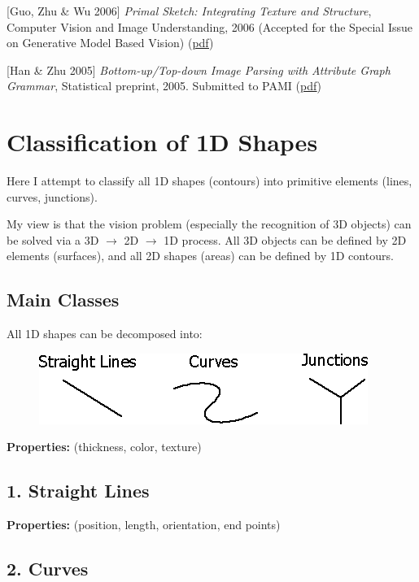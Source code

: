 [Guo,  Zhu \& Wu 2006] \emph{Primal Sketch: Integrating Texture and Structure}, 
Computer Vision and Image Understanding, 2006 (Accepted for the Special Issue on Generative Model Based Vision) (\href{http://www.stat.ucla.edu/~sczhu/papers/primal_sketch.pdf}{pdf})

[Han \& Zhu 2005] \emph{Bottom-up/Top-down Image Parsing with Attribute Graph Grammar}, 
Statistical preprint, 2005. Submitted to PAMI (\href{http://www.stat.ucla.edu/~sczhu/papers/PAMI_Grammar_rectangle.pdf}{pdf}) 

\section{Classification of 1D Shapes}

Here I attempt to classify all 1D shapes (contours) into primitive elements (lines, curves, junctions).

My view is that the vision problem (especially the recognition of 3D objects) can be solved via a 3D $\rightarrow$ 2D  $\rightarrow$ 1D process. All  3D objects can be defined by 2D elements (surfaces), and all 2D shapes (areas) can be defined by 1D contours.

\subsection{Main Classes}

All 1D shapes can be decomposed into: 

\begin{figure}[H]
\centering
\includegraphics[scale=0.7, bb=0 0 404 87]{1DClasses.PNG}
\end{figure}

\textbf{Properties:} (thickness, color, texture)

\subsection{1. Straight Lines}

\textbf{Properties:} (position, length, orientation, end points)

\subsection{2. Curves}

